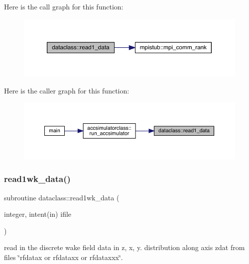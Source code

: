 Here is the call graph for this function\+:\nopagebreak
\begin{figure}[H]
\begin{center}
\leavevmode
\includegraphics[width=350pt]{namespacedataclass_a6733af7e3067d69140c61e2b4580a70b_cgraph}
\end{center}
\end{figure}
Here is the caller graph for this function\+:\nopagebreak
\begin{figure}[H]
\begin{center}
\leavevmode
\includegraphics[width=350pt]{namespacedataclass_a6733af7e3067d69140c61e2b4580a70b_icgraph}
\end{center}
\end{figure}
\mbox{\label{namespacedataclass_a2fed396f3daf5a5c465b01235d98c776}} 
\subsubsection{\texorpdfstring{read1wk\_data()}{read1wk\_data()}}
{\footnotesize\ttfamily subroutine dataclass\+::read1wk\+\_\+data (\begin{DoxyParamCaption}\item[{integer, intent(in)}]{ifile }\end{DoxyParamCaption})}



read in the discrete wake field data in z, x, y. distribution along axis zdat from files \char`\"{}rfdatax or rfdataxx 
 or rfdataxxx\char`\"{}. 


